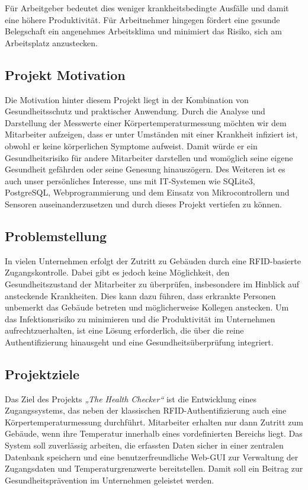 \vspace{1em}
\noindent Für Arbeitgeber bedeutet dies weniger krankheitsbedingte Ausfälle und damit eine höhere Produktivität. Für Arbeitnehmer hingegen fördert eine gesunde Belegschaft ein angenehmes Arbeitsklima und minimiert das Risiko, sich am Arbeitsplatz anzustecken.


\subsection{Projekt Motivation}

Die Motivation hinter diesem Projekt liegt in der Kombination von Gesundheitsschutz und praktischer Anwendung. Durch die Analyse und Darstellung der Messwerte einer Körpertemperaturmessung möchten wir dem Mitarbeiter aufzeigen, dass er unter Umständen mit einer Krankheit infiziert ist, obwohl er keine körperlichen Symptome aufweist. Damit würde er ein Gesundheitsrisiko für andere Mitarbeiter darstellen und womöglich seine eigene Gesundheit gefährden oder seine Genesung hinauszögern.
Des Weiteren ist es auch unser persönliches Interesse, uns mit IT-Systemen wie SQLite3, PostgreSQL, Webprogrammierung und dem Einsatz von Mikrocontrollern und Sensoren auseinanderzusetzen und durch dieses Projekt vertiefen zu können.

\subsection{Problemstellung}

In vielen Unternehmen erfolgt der Zutritt zu Gebäuden durch eine RFID-basierte Zugangskontrolle. Dabei gibt es jedoch keine Möglichkeit, den Gesundheitszustand der Mitarbeiter zu überprüfen, insbesondere im Hinblick auf ansteckende Krankheiten. Dies kann dazu führen, dass erkrankte Personen unbemerkt das Gebäude betreten und möglicherweise Kollegen anstecken. Um das Infektionsrisiko zu minimieren und die Produktivität im Unternehmen aufrechtzuerhalten, ist eine Lösung erforderlich, die über die reine Authentifizierung hinausgeht und eine Gesundheitsüberprüfung integriert.

\subsection{Projektziele}

Das Ziel des Projekts \textit{„The Health Checker“} ist die Entwicklung eines Zugangssystems, das neben der klassischen RFID-Authentifizierung auch eine Körpertemperaturmessung durchführt. Mitarbeiter erhalten nur dann Zutritt zum Gebäude, wenn ihre Temperatur innerhalb eines vordefinierten Bereichs liegt. Das System soll zuverlässig arbeiten, die erfassten Daten sicher in einer zentralen Datenbank speichern und eine benutzerfreundliche Web-GUI zur Verwaltung der Zugangsdaten und Temperaturgrenzwerte bereitstellen. Damit soll ein Beitrag zur Gesundheitsprävention im Unternehmen geleistet werden.

